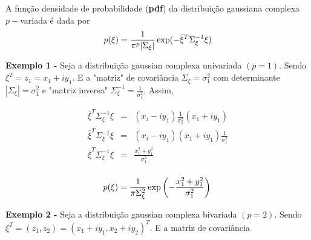 A função densidade de probabilidade ({\bf pdf}) da distribuição gaussiana complexa $p-$variada é dada por
\begin{equation}\label{eqn69}
	p(\xi)=\frac{1}{\pi^p|\Sigma_{\xi}|}\exp(-\bar{\xi}^{T}\Sigma_{\xi}^{-1}\xi)  \\
\end{equation}


{\bf Exemplo 1 -} Seja a distribuição gaussian complexa univariada $(p=1)$. Sendo $\xi^{T}=z_1=x_1+iy_1$. E a "matriz" de covariância $\Sigma_{\xi}=\sigma_{1}^{2}$ com determinante $|\Sigma_{\xi}|=\sigma_{1}^{2}$ e  "matriz inversa" $\Sigma_{\xi}^{-1}=\frac{1}{\sigma_{1}^{2}}$, Assim,

\begin{equation}\label{eqn70}
\begin{array}{ccc}
	\bar{\xi}^{T}\Sigma_{\xi}^{-1}\xi&=&(x_i-iy_1)\frac{1}{\sigma_1^2}(x_1+iy_1)  \\
	\bar{\xi}^{T}\Sigma_{\xi}^{-1}\xi&=&(x_i-iy_1)(x_1+iy_1)\frac{1}{\sigma_1^2}  \\
	\bar{\xi}^{T}\Sigma_{\xi}^{-1}\xi&=&\frac{x_1^2+y_1^2}{\sigma_1^2}  \\
\end{array}
\end{equation}


\begin{equation}\label{eqn71}
	p(\xi)=\frac{1}{\pi\Sigma_{\xi}^{2}}\exp\left(-\frac{x_1^2+y_1^2}{\sigma_1^2}\right)  \\
\end{equation}

{\bf Exemplo 2 -} Seja a distribuição gaussian complexa bivariada $(p=2)$. Sendo $\xi^{T}=(z_1, z_2)=(x_1 + iy_1, x_2 + iy_2)^{T}$. E a matriz de covariância 

